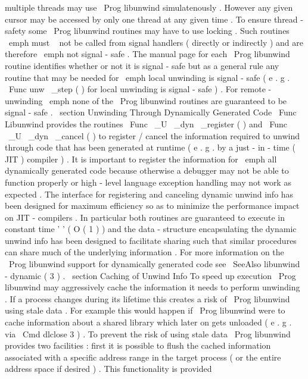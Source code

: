 multiple
threads
may
use
\
Prog
{
libunwind
}
simulatenously
.
However
any
given
cursor
may
be
accessed
by
only
one
thread
at
any
given
time
.
To
ensure
thread
-
safety
some
\
Prog
{
libunwind
}
routines
may
have
to
use
locking
.
Such
routines
\
emph
{
must
~
not
}
be
called
from
signal
handlers
(
directly
or
indirectly
)
and
are
therefore
\
emph
{
not
}
signal
-
safe
.
The
manual
page
for
each
\
Prog
{
libunwind
}
routine
identifies
whether
or
not
it
is
signal
-
safe
but
as
a
general
rule
any
routine
that
may
be
needed
for
\
emph
{
local
}
unwinding
is
signal
-
safe
(
e
.
g
.
\
Func
{
unw
\
_step
}
(
)
for
local
unwinding
is
signal
-
safe
)
.
For
remote
-
unwinding
\
emph
{
none
}
of
the
\
Prog
{
libunwind
}
routines
are
guaranteed
to
be
signal
-
safe
.
\
section
{
Unwinding
Through
Dynamically
Generated
Code
}
\
Func
{
Libunwind
}
provides
the
routines
\
Func
{
\
_U
\
_dyn
\
_register
}
(
)
and
\
Func
{
\
_U
\
_dyn
\
_cancel
}
(
)
to
register
/
cancel
the
information
required
to
unwind
through
code
that
has
been
generated
at
runtime
(
e
.
g
.
by
a
just
-
in
-
time
(
JIT
)
compiler
)
.
It
is
important
to
register
the
information
for
\
emph
{
all
}
dynamically
generated
code
because
otherwise
a
debugger
may
not
be
able
to
function
properly
or
high
-
level
language
exception
handling
may
not
work
as
expected
.
The
interface
for
registering
and
canceling
dynamic
unwind
info
has
been
designed
for
maximum
efficiency
so
as
to
minimize
the
performance
impact
on
JIT
-
compilers
.
In
particular
both
routines
are
guaranteed
to
execute
in
constant
time
'
'
(
O
(
1
)
)
and
the
data
-
structure
encapsulating
the
dynamic
unwind
info
has
been
designed
to
facilitate
sharing
such
that
similar
procedures
can
share
much
of
the
underlying
information
.
For
more
information
on
the
\
Prog
{
libunwind
}
support
for
dynamically
generated
code
see
\
SeeAlso
{
libunwind
-
dynamic
(
3
)
}
.
\
section
{
Caching
of
Unwind
Info
}
To
speed
up
execution
\
Prog
{
libunwind
}
may
aggressively
cache
the
information
it
needs
to
perform
unwinding
.
If
a
process
changes
during
its
lifetime
this
creates
a
risk
of
\
Prog
{
libunwind
}
using
stale
data
.
For
example
this
would
happen
if
\
Prog
{
libunwind
}
were
to
cache
information
about
a
shared
library
which
later
on
gets
unloaded
(
e
.
g
.
via
\
Cmd
{
dlclose
}
{
3
}
)
.
To
prevent
the
risk
of
using
stale
data
\
Prog
{
libunwind
}
provides
two
facilities
:
first
it
is
possible
to
flush
the
cached
information
associated
with
a
specific
address
range
in
the
target
process
(
or
the
entire
address
space
if
desired
)
.
This
functionality
is
provided

